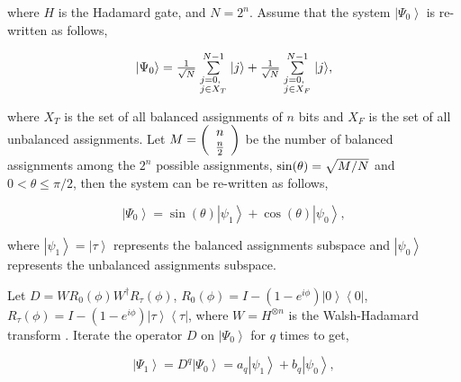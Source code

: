\documentclass[a4paper]{article}
\begin{document}
\noindent
where $H$ is the Hadamard gate, and $N=2^n$. 
Assume that the system $\left| {\Psi _0 } \right\rangle$ is re-written as follows,

\begin{equation}
\label{ENheqn39}
\begin{array}{l}
\left|\Psi_0\right\rangle =  \frac{1}{{\sqrt N }} \sum\limits_{\scriptstyle j = 0, \hfill \atop 
  \scriptstyle j \in X_T  \hfill}^{N - 1} {\left| j \right\rangle} 
  + \frac{1}{{\sqrt N }} \sum\limits_{\scriptstyle j = 0, \hfill \atop 
  \scriptstyle j \in X_F  \hfill}^{N - 1} {\left| j \right\rangle},\\
\end{array} 
\end{equation}

\noindent
where $X_T$ is the set of all balanced assignments of $n$ bits and $X_F$ is the set of all 
unbalanced assignments. Let $M=\left( {\begin{array}{*{20}c}
   n  \\
   {{\textstyle{n \over 2}}}  \\
\end{array}} \right)$ be the number of balanced assignments among the $2^n$ possible assignments, 
$\sin (\theta ) = \sqrt {{M \mathord{\left/ {\vphantom {M N}} \right.\kern-\nulldelimiterspace} N}}$ 
and $0 < \theta  \le \pi /2$, then the system can be re-written as follows,
 


\begin{equation}
\left|\Psi_0\right\rangle  = \sin (\theta )\left| {\psi _1 } \right\rangle  + \cos (\theta )\left| {\psi _0 } \right\rangle,
\end{equation}

\noindent
where $\left| {\psi _1 } \right\rangle= \left| {\tau  } \right\rangle$ represents the balanced assignments subspace and 
$\left| {\psi _0 } \right\rangle$ represents the unbalanced assignments subspace. 



Let $D=WR_0 \left( \phi  \right)W^\dag  R_\tau  \left( \phi  \right)$, 
$R_0 \left( \phi  \right) = I - (1 - e^{i\phi } )\left| 0 \right\rangle \left\langle 0 \right|$, 
$R_\tau  \left( \phi  \right) = I - (1 - e^{i\phi } )\left| \tau  \right\rangle \left\langle \tau  \right|$, 
where $W=H^{\otimes n}$ is the Walsh-Hadamard transform \cite{hoyer00}. 
Iterate the operator $D$ on $\left|\Psi_0\right\rangle$ for $q$ times to get,


\begin{equation}
\left| {\Psi _1 } \right\rangle  = D^{q}\left| {\Psi_0 } \right\rangle  = a_q \left| {\psi _1 } \right\rangle  + b_q \left| {\psi _0 } \right\rangle ,
\end{equation}
\end{document}

